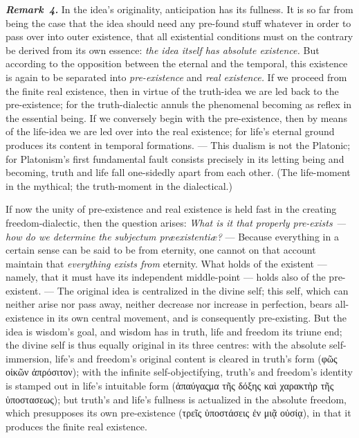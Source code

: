 \documentclass[12pt]{book}
\newcommand{\anm}[1]{\emph{\textbf{Remark~#1.}}}
\begin{document}
\anm{4} In the idea's originality, anticipation has its fullness. It is so
far from being the case that the idea should need any pre-found stuff
whatever in order to pass over into outer existence, that all existential
conditions must on the contrary be derived from its own essence: \emph{the
idea itself has absolute existence.} But according to the opposition between
the eternal and the temporal, this existence is again to be separated into
\emph{pre-existence} and \emph{real existence.} If we proceed from the
finite real existence, then in virtue of the truth-idea we are led back to
the pre-existence; for the truth-dialectic annuls the phenomenal becoming as
reflex in the essential being. If we conversely begin with the
pre-existence, then by means of the life-idea we are led over into the real
existence; for life's eternal ground produces its content in temporal
formations. --- This dualism is not the Platonic; for Platonism's first
fundamental fault consists precisely in its letting being and becoming,
truth and life fall one-sidedly apart from each other. (The life-moment in
the mythical; the truth-moment in the dialectical.)

If now the unity of pre-existence and real existence is held fast in the
creating freedom-dialectic, then the question arises: \emph{What is it that
properly pre-exists --- how do we determine the \textit{subjectum
præexistentiæ}?} --- Because everything in a certain sense can be said to be
from eternity, one cannot on that account maintain that \emph{everything
exists from} eternity. What holds of the existent --- namely, that it must
have its independent middle-point --- holds also of the pre-existent. ---
The original idea is centralized in the divine self; this self, which can
neither arise nor pass away, neither decrease nor increase in perfection,
bears all-existence in its own central movement, and is consequently
pre-existing. But the idea is wisdom's goal, and wisdom has in truth, life
and freedom its triune end; the divine self is thus equally original in its
three centres: with the absolute self-immersion, life's and freedom's
original content is cleared in truth's form (φῶς οἰκῶν ἀπρόσιτον); with the
infinite self-objectifying, truth's and freedom's identity is stamped out in
life's intuitable form (ἀπαύγαςμα τῆς δόξης καὶ χαρακτὴρ τῆς ὑποστασεως);
but truth's and life's fullness is actualized in the absolute freedom, which
presupposes its own pre-existence (τρεῖς ὑποστάσεις ἐν μιᾷ οὐσίᾳ), in that
it produces the finite real existence.
\end{document}
